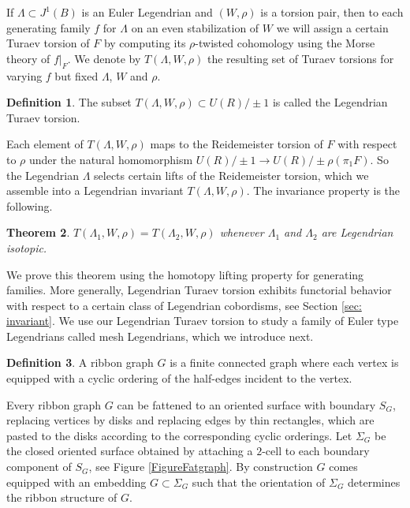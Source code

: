 \documentclass[11pt]{article}
\numberwithin{equation}{section}\providecommand{\dpl}{\displaystyle}
\theoremstyle{plain}
\newtheorem{theorem}{Theorem}[section]
\theoremstyle{definition}
\newtheorem{definition}[theorem]{Definition}
\begin{document}
If $\Lambda \subset J^1(B)$ is an Euler Legendrian and $(W,\rho)$ is a torsion pair, then to each generating family $f$ for $\Lambda$ on an even stabilization of $W$ we will assign a certain Turaev torsion of $F$ by computing its $\rho$-twisted cohomology using the Morse theory of $f|_F$. We denote by $T(\Lambda, W, \rho)$ the resulting set of Turaev torsions for varying $f$ but fixed $\Lambda$, $W$ and $\rho$.

\begin{definition} The subset $T(\Lambda, W, \rho) \subset U(R) / \pm1$ is called the Legendrian Turaev torsion. \end{definition}

Each element of $T(\Lambda,W,\rho)$ maps to the Reidemeister torsion of $F$ with respect to $\rho$ under the natural homomorphism $U(R) / \pm 1 \to U(R) / \pm \rho(\pi_1 F)$. So the Legendrian $\Lambda$ selects certain lifts of the Reidemeister torsion, which we assemble into a Legendrian invariant $T(\Lambda, W, \rho)$. The invariance property is the following.
\begin{theorem} $T(\Lambda_1,W,\rho)=T(\Lambda_2, W, \rho)$ whenever $\Lambda_1$ and $\Lambda_2$ are Legendrian isotopic.
\end{theorem}
We prove this theorem using the homotopy lifting property for generating families. More generally, Legendrian Turaev torsion exhibits functorial behavior with respect to a certain class of Legendrian cobordisms, see Section \ref{sec: invariant}. We use our Legendrian Turaev torsion to study a family of Euler type Legendrians called mesh Legendrians, which we introduce next.

\begin{definition} A ribbon graph $G$ is a finite connected graph where each vertex is equipped with a cyclic ordering of the half-edges incident to the vertex.
\end{definition}

Every ribbon graph $G$ can be fattened to an oriented surface with boundary $S_G$, replacing vertices by disks and replacing edges by thin rectangles, which are pasted to the disks according to the corresponding cyclic orderings. Let $\Sigma_G$ be the closed oriented surface obtained by attaching a $2$-cell to each boundary component of $S_G$, see Figure \ref{FigureFatgraph}. By construction $G$ comes equipped with an embedding $G \subset \Sigma_G$ such that the orientation of $\Sigma_G$ determines the ribbon structure of $G$.
\end{document}
